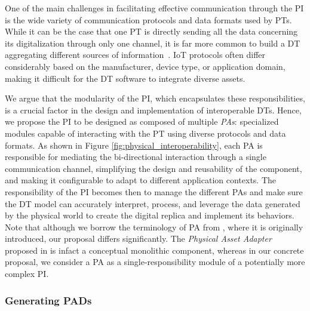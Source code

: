 One of the main challenges in facilitating effective communication through the \ac{PI} is the wide variety of communication protocols and data formats used by \acp{PT}.
%
While it can be the case that one \ac{PT} is directly sending all the data concerning its digitalization through only one channel,
it is far more common to build a \ac{DT} aggregating different sources of information~\cite{qi2018dt-and-bigdata}.
%
\ac{IoT} protocols often differ considerably based on the manufacturer, device type, or application domain, making it difficult for the \ac{DT} software to integrate diverse assets.

%
We argue that the modularity of the \ac{PI}, which encapsulates these responsibilities, is a crucial factor in the design and implementation of interoperable \acp{DT}.
%
Hence, we propose the \ac{PI} to be designed as composed of multiple \emph{\acp{PA}}: specialized modules capable of interacting with the \ac{PT} using diverse protocols and data formats.
%
As shown in Figure \ref{fig:physical_interoperability}, each \ac{PA} is responsible for mediating the bi-directional interaction through a single communication channel, simplifying the design and reusability of the component, and making it configurable to adapt to different application contexts.
%
The responsibility of the \ac{PI} becomes then to manage the different \acp{PA} and make sure the \ac{DT} model can accurately interpret, process, and leverage the data generated by the physical world to create the digital replica and implement its behaviors.
%
Note that although we borrow the terminology of \ac{PA} from \cite{web-of-dt-ricci-2022}, where it is originally introduced, our proposal differs significantly.
The \emph{Physical Asset Adapter} proposed in \cite{web-of-dt-ricci-2022} is infact a conceptual monolithic component, whereas in our concrete proposal, we consider a \ac{PA} as a single-responsibility module of a potentially more complex \ac{PI}.

\subsubsection{Generating \aclp{PAD}}

